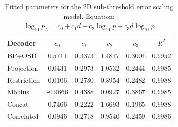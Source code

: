 \begin{table}[hbt!]
\centering
\begin{tabular}{l c c c c c}
\toprule
Decoder & $c_0$ & $c_1$ & $c_2$ & $c_3$ & $R^2$ \\
\midrule
BP+OSD & 0.5711 & 0.3373 & 1.4877 & 0.3004 & 0.9952 \\
Projection & 0.0431 & 0.2973 & 1.0532 & 0.2444 & 0.9985 \\
Restriction & 0.0106 & 0.2780 & 0.8954 & 0.2482 & 0.9988 \\
Möbius & -0.9666 & 0.4388 & 0.0927 & 0.3867 & 0.9985 \\
Concat & 0.7466 & 0.2222 & 1.6693 & 0.1965 & 0.9988 \\
Correlated & 0.0946 & 0.2718 & 0.9540 & 0.2459 & 0.9986 \\
\bottomrule
\end{tabular}
\caption{Fitted parameters for the 2D sub-threshold error scaling model. Equation: $\log_{10} p_L = c_0 + c_1 d + c_2 \log_{10} p + c_3 d \log_{10} p$}
\label{tab:error_scaling_fit}
\end{table}
